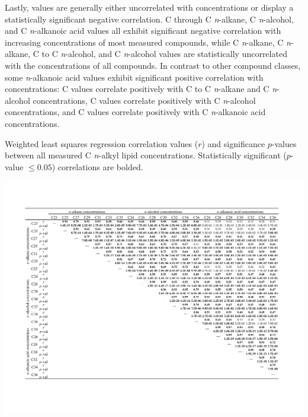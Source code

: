 Lastly,  values are generally either uncorrelated with concentrations or display a statistically significant negative correlation. C through C \textit{n}-alkane, C \textit{n}-alcohol, and C \textit{n}-alkanoic acid  values all exhibit significant negative correlation with increasing concentrations of most measured compounds, while C \textit{n}-alkane, C \textit{n}-alkane, C to C \textit{n}-alcohol, and C \textit{n}-alcohol  values are statistically uncorrelated with the concentrations of all compounds. In contrast to other compound classes, some \textit{n}-alkanoic acid  values exhibit significant positive correlation with concentrations: C  values correlate positively with C to C \textit{n}-alkane and C \textit{n}-alcohol concentrations, C  values correlate positively with C \textit{n}-alcohol concentrations, and C  values correlate positively with C \textit{n}-alkanoic acid concentrations. 

\begin{table}
	\caption[C concentration correlation $r$ and $p$-values]{Weighted least squares regression correlation values ($r$) and significance $p$-values between all measured C \textit{n}-alkyl lipid concentrations. Statistically significant ($p$-value $\leq  0.05$) correlations are bolded.}
	\centering
		\includegraphics{Thesis_Tables/Ch4Tab1}
	\label{Ch4Tab:1} 
\end{table}

